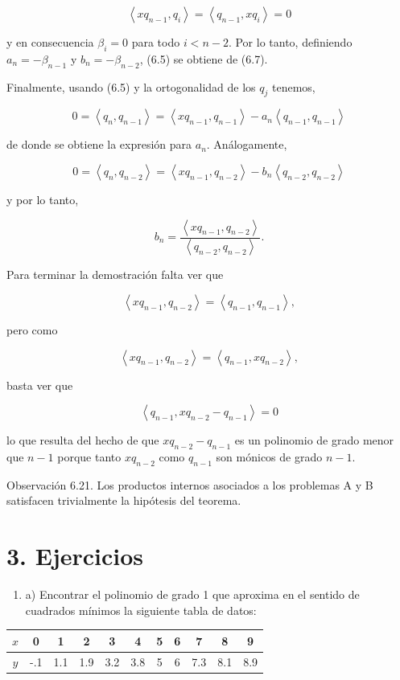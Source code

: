 \documentclass[10pt]{article}
\begin{document}
$$
\left\langle x q_{n-1}, q_{i}\right\rangle=\left\langle q_{n-1}, x q_{i}\right\rangle=0
$$

y en consecuencia $\beta_{i}=0$ para todo $i<n-2$. Por lo tanto, definiendo $a_{n}=-\beta_{n-1}$ y $b_{n}=-\beta_{n-2}$, (6.5) se obtiene de (6.7).

Finalmente, usando (6.5) y la ortogonalidad de los $q_{j}$ tenemos,

$$
0=\left\langle q_{n}, q_{n-1}\right\rangle=\left\langle x q_{n-1}, q_{n-1}\right\rangle-a_{n}\left\langle q_{n-1}, q_{n-1}\right\rangle
$$

de donde se obtiene la expresión para $a_{n}$. Análogamente,

$$
0=\left\langle q_{n}, q_{n-2}\right\rangle=\left\langle x q_{n-1}, q_{n-2}\right\rangle-b_{n}\left\langle q_{n-2}, q_{n-2}\right\rangle
$$

y por lo tanto,

$$
b_{n}=\frac{\left\langle x q_{n-1}, q_{n-2}\right\rangle}{\left\langle q_{n-2}, q_{n-2}\right\rangle} .
$$

Para terminar la demostración falta ver que

$$
\left\langle x q_{n-1}, q_{n-2}\right\rangle=\left\langle q_{n-1}, q_{n-1}\right\rangle,
$$

pero como

$$
\left\langle x q_{n-1}, q_{n-2}\right\rangle=\left\langle q_{n-1}, x q_{n-2}\right\rangle,
$$

basta ver que

$$
\left\langle q_{n-1}, x q_{n-2}-q_{n-1}\right\rangle=0
$$

lo que resulta del hecho de que $x q_{n-2}-q_{n-1}$ es un polinomio de grado menor que $n-1$ porque tanto $x q_{n-2}$ como $q_{n-1}$ son mónicos de grado $n-1$.

Observación 6.21. Los productos internos asociados a los problemas A y B satisfacen trivialmente la hipótesis del teorema.

\section*{3. Ejercicios}
\begin{enumerate}
  \item a) Encontrar el polinomio de grado 1 que aproxima en el sentido de cuadrados mínimos la siguiente tabla de datos:
\end{enumerate}

\begin{center}
\begin{tabular}{|c|c|c|c|c|c|c|c|c|c|c|}
\hline
$x$ & 0 & 1 & 2 & 3 & 4 & 5 & 6 & 7 & 8 & 9 \\
\hline
$y$ & -.1 & 1.1 & 1.9 & 3.2 & 3.8 & 5 & 6 & 7.3 & 8.1 & 8.9 \\
\hline
\end{tabular}
\end{center}
\end{document}
